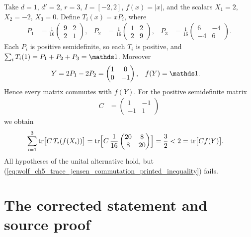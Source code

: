 \documentclass{article}
\begin{document}
Take $d=1$, $d'=2$, $r=3$, $I=[-2,2]$, $f(x)=|x|$, and the scalars
$X_1=2$, $X_2=-2$, $X_3=0$. Define $T_i(x)=xP_i$, where
\begin{align}
    P_1&=\frac1{16}\begin{pmatrix}9&2\\2&1\end{pmatrix},
    &
    P_2&=\frac1{16}\begin{pmatrix}1&2\\2&9\end{pmatrix},
    &
    P_3&=\frac1{16}\begin{pmatrix}6&-4\\-4&6\end{pmatrix}.
    \label{eq:wolf_ch5_trace_jensen_commutation_weights}
\end{align}
Each $P_i$ is positive semidefinite, so each $T_i$ is positive, and
$\sum_iT_i(1)=P_1+P_2+P_3=\Id$. Moreover
\begin{align}
    Y&=2P_1-2P_2=\begin{pmatrix}1&0\\0&-1\end{pmatrix},
    &
    f(Y)&=\Id.
    \label{eq:wolf_ch5_trace_jensen_commutation_identity_image}
\end{align}
Hence every matrix commutes with $f(Y)$. For the positive semidefinite
matrix
\begin{align}
    C&=\begin{pmatrix}1&-1\\-1&1\end{pmatrix}
    \label{eq:wolf_ch5_trace_jensen_commutation_test_matrix}
\end{align}
we obtain
\begin{align}
    \sum_{i=1}^3\operatorname{tr}\bigl[C\,T_i(f(X_i))\bigr]
        &=\operatorname{tr}\Bigl[C\,\frac1{16}\begin{pmatrix}20&8\\8&20\end{pmatrix}\Bigr]
        =\frac32
        <2=\operatorname{tr}\bigl[Cf(Y)\bigr].
    \label{eq:wolf_ch5_trace_jensen_commutation_violation}
\end{align}
All hypotheses of the unital alternative hold, but
(\ref{eq:wolf_ch5_trace_jensen_commutation_printed_inequality}) fails.

\section{The corrected statement and source proof}
\end{document}
